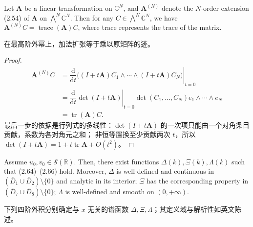 \begin{paperlemmaen}\label{lem:2.3}
Let $\mathbf A$ be a linear transformation on $\mathbb C^N$, and $\mathbf A^{(N)}$ denote the $N$-order extension (2.54) of $\mathbf A$ on $\bigwedge^N\mathbb C^N$.
Then for any $C\in\bigwedge^N\mathbb C^N$, we have
$\mathbf A^{(N)}C=\operatorname{trace}(\mathbf A)C$, where trace represents the trace of the matrix.
\end{paperlemmaen}
\begin{paperlemmacn*}
在最高阶外幂上，加法扩张等于乘以原矩阵的迹。
\end{paperlemmacn*}
\begin{proof}
\begin{align*}
\mathbf A^{(N)}C
&=\left.\dfrac{\mathrm d}{\mathrm dt}
\bigl((I+t\mathbf A)C_1\wedge\cdots\wedge(I+t\mathbf A)C_N\bigr)\right|_{t=0}\\
&=\left.\dfrac{\mathrm d}{\mathrm dt}\det(I+t\mathbf A)\right|_{t=0}
\det(C_1,\ldots,C_N)e_1\wedge\cdots\wedge e_N\\
&=\operatorname{tr}(\mathbf A)C.
\end{align*}
最后一步的依据是行列式的多线性：$\det(I+t\mathbf A)$ 的一次项只能由一个对角条目贡献，系数为各对角元之和；
非恒等置换至少贡献两次 $t$，所以 $\det(I+t\mathbf A)=1+t\operatorname{tr}\mathbf A+O(t^2)$。
\end{proof}
\begin{paperlemmaen}\label{lem:2.4}
Assume $u_0,v_0\in\mathcal S(\mathbb R)$. Then, there exist functions $\Delta(k),\Xi(k),\Lambda(k)$ such that (2.64)--(2.66) hold.
Moreover, $\Delta$ is well-defined and continuous in $(\overline D_1\cup\overline D_2)\setminus\{0\}$ and analytic in its interior;
$\Xi$ has the corresponding property in $(\overline D_7\cup\overline D_8)\setminus\{0\}$;
$\Lambda$ is well-defined and smooth on $(0,+\infty)$.
\end{paperlemmaen}
\begin{paperlemmacn*}
下列四阶外积分别确定与 $x$ 无关的谱函数 $\Delta,\Xi,\Lambda$；其定义域与解析性如英文陈述。
\end{paperlemmacn*}
